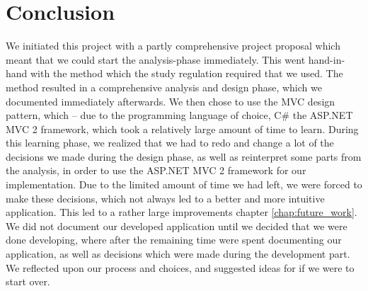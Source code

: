 \chapter{Conclusion}
\label{chap:conclusion}

We initiated this project with a partly comprehensive project proposal which meant that we could start the analysis-phase immediately. This went hand-in-hand with the \ooad{} method which the study regulation required that we used. The \ooad{} method resulted in a comprehensive analysis and design phase, which we documented immediately afterwards. We then chose to use the MVC design pattern, which -- due to the programming language of choice, C\# the ASP.NET MVC 2 framework, which took a relatively large amount of time to learn. During this learning phase, we realized that we had to redo and change a lot of the decisions we made during the design phase, as well as reinterpret some parts from the analysis, in order to use the ASP.NET MVC 2 framework for our implementation. Due to the limited amount of time we had left, we were forced to make these decisions, which not always led to a better and more intuitive application. This led to a rather large improvements chapter \ref{chap:future_work}. We did not document our developed application until we decided that we were done developing, where after the remaining time were spent documenting our application, as well as decisions which were made during the development part. We reflected upon our process and choices, and suggested ideas for if we were to start over.








